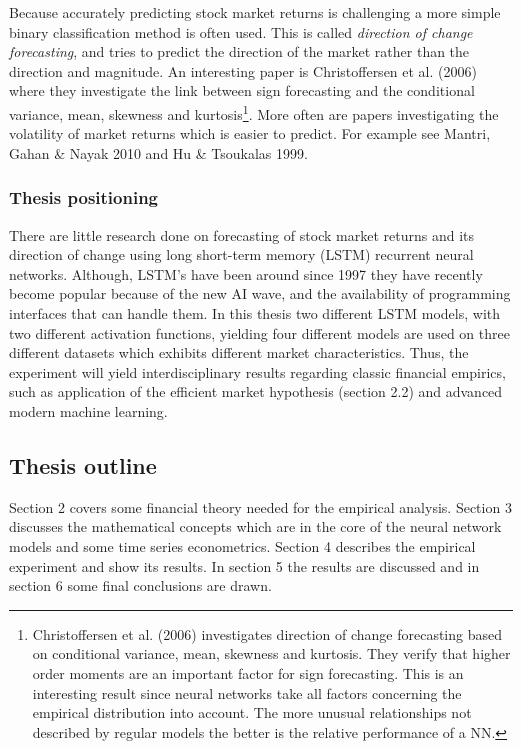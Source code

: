 \documentclass[12pt, letterpaper]{amsart}%
\begin{document}
Because accurately predicting stock market returns is challenging a more simple binary classification method is often used. This is called \textit{direction of change forecasting}, and tries to predict the direction of the market rather than the direction and magnitude. An interesting paper is Christoffersen et al. (2006) where they investigate the link between sign forecasting and the conditional variance, mean, skewness and kurtosis\footnote{Christoffersen et al. (2006) investigates direction of change forecasting based on conditional variance, mean, skewness and kurtosis. They verify that higher order moments are an important factor for sign forecasting. This is an interesting result since neural networks take all factors concerning the empirical distribution into account. The more unusual relationships not described by regular models the better is the relative performance of a NN.}. More often are papers investigating the volatility of market returns which is easier to predict. For example see Mantri, Gahan \& Nayak 2010 and Hu \& Tsoukalas 1999.

\subsubsection{Thesis positioning}
There are little research done on forecasting of stock market returns and its direction of change using long short-term memory (LSTM) recurrent neural networks. Although, LSTM's have been around since 1997 they have recently become popular because of the new AI wave, and the availability of programming interfaces that can handle them. In this thesis two different LSTM models, with two different activation functions, yielding four different models are used on three different datasets which exhibits different market characteristics. Thus, the experiment will yield interdisciplinary results regarding classic financial empirics, such as application of the efficient market hypothesis (section 2.2) and advanced modern machine learning.

\subsection{Thesis outline}
Section 2 covers some financial theory needed for the empirical analysis. Section 3 discusses the mathematical concepts which are in the core of the neural network models and some time series econometrics. Section 4 describes the empirical experiment and show its results. In section 5 the results are discussed and in section 6 some final conclusions are drawn.
\end{document}
